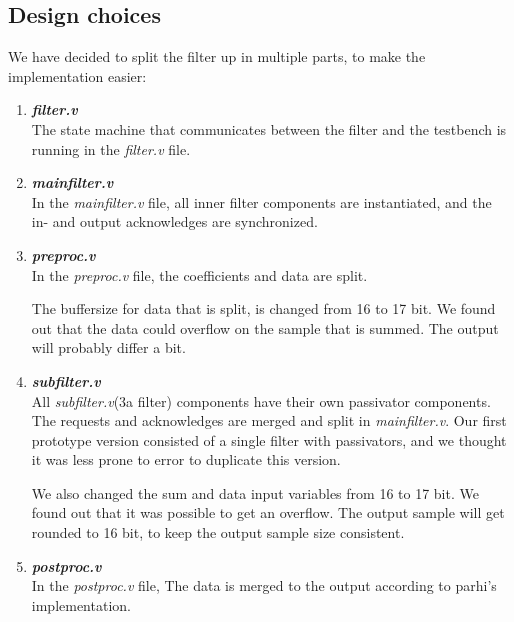 \documentclass[a4paper,twoside,11pt, fleqn]{article}
\begin{document}
\subsection{Design choices}
We have decided to split the filter up in multiple parts, to make the implementation easier:
\begin{enumerate}
\item \textbf{\textit{filter.v}}\\
The state machine that communicates between the filter and the testbench is running in the \textit{filter.v} file.

\item \textbf{\textit{mainfilter.v}}\\	
In the \textit{mainfilter.v} file, all inner filter components are instantiated, and the in- and output acknowledges are synchronized.	

\item \textbf{\textit{preproc.v}}\\	
In the \textit{preproc.v} file, the coefficients and data are split.

The buffersize for data that is split, is changed from 16 to 17 bit. We found out that the data could overflow on the sample that is summed. The output will probably differ a bit.

\item \textbf{\textit{subfilter.v}}\\
{All \textit{subfilter.v}(3a filter) components have their own passivator components. The requests and acknowledges are merged and split in \textit{mainfilter.v}. Our first prototype version consisted of a single filter with passivators, and we thought it was less prone to error to duplicate this version.}

We also changed the sum and data input variables from 16 to 17 bit. We found out that it was possible to get an overflow. The output sample will get rounded to 16 bit, to keep the output sample size consistent.	

\item \textbf{\textit{postproc.v}}\\	
In the \textit{postproc.v} file, The data is merged to the output according to parhi's implementation.	
\end{enumerate}
\end{document}
